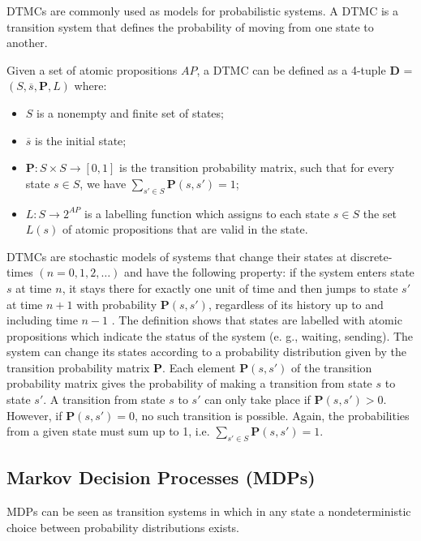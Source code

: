 DTMCs are commonly used as models for probabilistic systems. A DTMC is a transition system that defines the probability of moving from one state to another.
\begin{definition}[DTMC]\label{def:DTMC}
Given a set of atomic propositions $AP$, a DTMC can be defined as a 4-tuple
$\mathbf{D}$ = $(S,\overline{s},\mathbf{P},L)$ where:

\begin{itemize}
  \item  $S$ is a nonempty and finite set of states;
  \item  $\overline{s}$ is the initial state;
  \item  $\mathbf{P} :  S\times S\rightarrow[0,1]$ is the transition
  probability matrix, such that for every state $s\in{S}$, we have
  $ \sum_{s' \in{S}} \mathbf{P}(s,s' )=1$;
  \item  $L : S\rightarrow 2^{AP}$  is a labelling function which assigns to each state $s \in S$ the set $L(s)$ of atomic propositions that are valid in the state.
\end{itemize}
\end{definition}


DTMCs are stochastic models of systems that change their states at discrete-times $(n=0,1,2,\dots)$ and have the following property: if the system enters state $s$ at time $n$, it stays there for exactly one unit of time and then jumps to state $s'$ at time $n+1$ with probability $\mathbf{P}(s, s')$, regardless of its history up to and including time $n-1$ \cite{Kulkarni1995}. The definition shows that states are labelled with atomic propositions which indicate the status of the system (e. g., waiting, sending). The system can change its states according to a probability distribution given by the transition probability matrix $\mathbf{P}$. Each element $\mathbf{P} (s,s')$ of the transition probability matrix gives the probability of making a transition from state $s$ to state $s'$. A transition from state $s$ to $s'$ can only take place if $\mathbf{P}(s, s') > 0$. However, if $\mathbf{P}(s, s') = 0$, no such transition is possible. Again, the probabilities from a given state must sum up to 1, i.e. $\sum_{s' \in{S}} \mathbf{P}(s,s' )=1$.


\subsection{Markov Decision Processes (MDPs)} \label{sec:MDP-cha2}
MDPs can be seen as transition systems in which in any state a nondeterministic choice between probability distributions exists.

